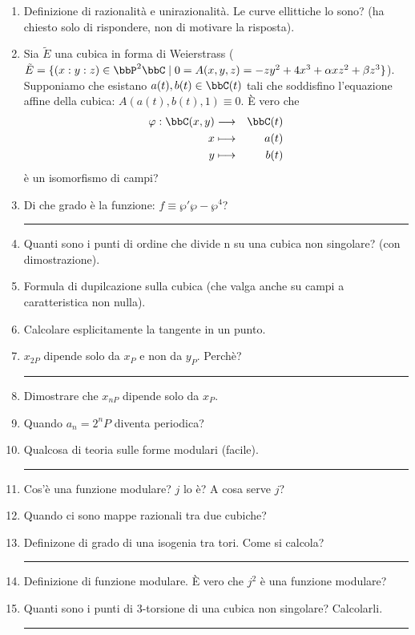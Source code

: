 \begin{enumerate}
\item Definizione di razionalità e unirazionalità. Le curve ellittiche lo sono? (ha chiesto solo di rispondere, non di motivare la risposta).
\item Sia $\tilde E$ una cubica in forma di Weierstrass ($\tilde E= \{ (x:y:z)\in \bbP^{2}\bbC \mid 0=A(x, y, z)=-zy^{2}+4x^{3}+\alpha xz^{2} + \beta z^{3} \}$). Supponiamo che esistano $a(t), b(t) \in \bbC(t)$ tali che soddisfino l'equazione affine della cubica: $A(a(t), b(t), 1) \equiv 0$. \`E vero che 
\begin{alignat*}{2}
	\varphi:\bbC(x,y)&\longrightarrow	&\bbC(t)\\
		x	&\longmapsto		&a(t)\\
		y	&\longmapsto		&b(t)\\
\end{alignat*}
è un isomorfismo di campi?
\item Di che grado è la funzione: $f \equiv \wp '\wp - \wp^{4}$?
\bigskip
\hrule
\bigskip

\item Quanti sono i punti di ordine che divide n su una cubica non singolare? (con dimostrazione).
\item Formula di dupilcazione sulla cubica (che valga anche su campi a caratteristica non nulla).
\item Calcolare esplicitamente la tangente in un punto.
\item $x_{2P}$ dipende solo da $x_{P}$ e non da $y_{P}$. Perchè?
\bigskip
\hrule
\bigskip

\item Dimostrare che $x_{nP}$ dipende solo da $x_{P}$.
\item Quando $a_{n}=2^{n}P$ diventa periodica?
\item Qualcosa di teoria sulle forme modulari (facile).
\bigskip
\hrule
\bigskip

\item Cos'è una funzione modulare? $j$ lo è? A cosa serve $j$?
\item Quando ci sono mappe razionali tra due cubiche?
\item Definizone di grado di una isogenia tra tori. Come si calcola?
\bigskip
\hrule
\bigskip

\item Definizione di funzione modulare. \`E vero che $j^{2}$ è una funzione modulare?
\item Quanti sono i punti di 3-torsione di una cubica non singolare? Calcolarli. 
\bigskip
\hrule
\bigskip


\end{enumerate}
